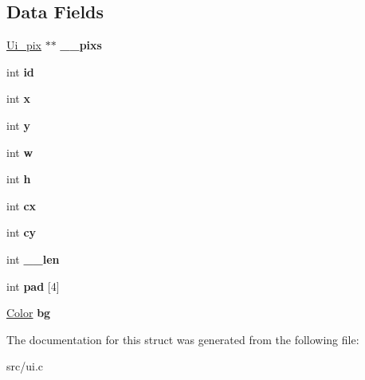 \subsection*{Data Fields}
\begin{DoxyCompactItemize}
\item 
\mbox{\label{struct__Ui__box_a03e07792d6c14766638d58e9e2edb844}} 
\hyperlink{struct__Ui__pix}{Ui\+\_\+pix} $\ast$$\ast$ {\bfseries \+\_\+\+\_\+pixs}
\item 
\mbox{\label{struct__Ui__box_a4aa502d3b25a87a1465283d9ccc9fa77}} 
int {\bfseries id}
\item 
\mbox{\label{struct__Ui__box_a6e8c0df6554097fd1d0d0aa84d40ac29}} 
int {\bfseries x}
\item 
\mbox{\label{struct__Ui__box_a7bacb19580dcf6ece3ca60b64f62e459}} 
int {\bfseries y}
\item 
\mbox{\label{struct__Ui__box_a90f1e8d481ccbf0cc06e3bbb1c12b386}} 
int {\bfseries w}
\item 
\mbox{\label{struct__Ui__box_ab81930762400818df39bd6acc348d26f}} 
int {\bfseries h}
\item 
\mbox{\label{struct__Ui__box_aa44d253872cfb9297e3fa71b93d9fc88}} 
int {\bfseries cx}
\item 
\mbox{\label{struct__Ui__box_a993ecc3e3509632642cb403b731d9a6d}} 
int {\bfseries cy}
\item 
\mbox{\label{struct__Ui__box_ade30a16b2e23d494a77767ce516f00d9}} 
int {\bfseries \+\_\+\+\_\+len}
\item 
\mbox{\label{struct__Ui__box_a4030a2fd2487e5a4cde2b4fccc999166}} 
int {\bfseries pad} \mbox{[}4\mbox{]}
\item 
\mbox{\label{struct__Ui__box_a2562527c18b6318ba537faae8dd2d06c}} 
\hyperlink{ui_8h_ab87bacfdad76e61b9412d7124be44c1c}{Color} {\bfseries bg}
\end{DoxyCompactItemize}


The documentation for this struct was generated from the following file\+:\begin{DoxyCompactItemize}
\item 
src/ui.\+c\end{DoxyCompactItemize}
